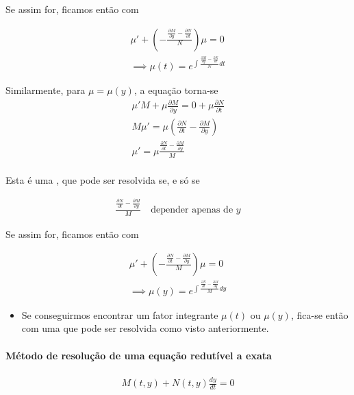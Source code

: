 \documentclass{article}
\begin{document}
Se assim for, ficamos então com

\begin{gather*}
\mu' + \left( - \frac{\frac{\partial M}{\partial y} - \frac{\partial N}{\partial t}}{N} \right) \mu = 0 \\
\implies \mu(t) = e^{\int \frac{\frac{\partial M}{\partial y} - \frac{\partial N}{\partial t}}{N} dt}
\end{gather*}

Similarmente, para $\mu = \mu(y)$, a equação torna-se
\begin{gather*}
\mu' M + \mu \frac{\partial M}{\partial y} = 0 + \mu \frac{\partial N}{\partial t} \\
M \mu' = \mu \left( \frac{\partial N}{\partial t} - \frac{\partial M}{\partial y} \right) \\
\mu' = \mu \frac{\frac{\partial N}{\partial t} - \frac{\partial M}{\partial y}}{M} \\
\end{gather*}

Esta é uma , que pode ser resolvida se, e só se

\begin{gather*}
\frac{\frac{\partial N}{\partial t} - \frac{\partial M}{\partial y}}{M} \quad \text{depender apenas de } y
\end{gather*}

Se assim for, ficamos então com

\begin{gather*}
\mu' + \left( - \frac{\frac{\partial N}{\partial t} - \frac{\partial M}{\partial y}}{M} \right) \mu = 0 \\
\implies \mu(y) = e^{\int \frac{\frac{\partial N}{\partial t} - \frac{\partial M}{\partial y}}{M} dy}
\end{gather*}

\bigskip

\begin{itemize}
    \item Se conseguirmos encontrar um fator integrante $\mu(t)$ ou $\mu(y)$, fica-se então com uma  que pode ser resolvida como visto anteriormente.
\end{itemize}

\paragraph{Método de resolução de uma equação redutível a exata}
\begin{gather*}
M(t,y) + N(t,y) \frac{dy}{dt} = 0
\end{gather*}
\end{document}
